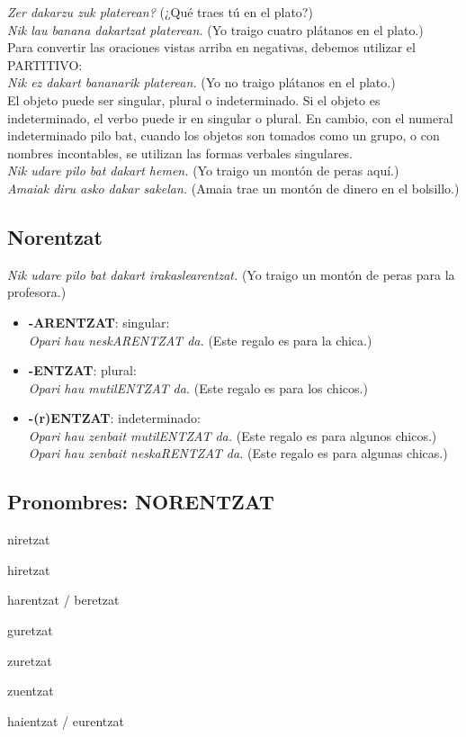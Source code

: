 \documentclass[11pt, a4paper]{article}
\begin{document}
\indent \textit{Zer dakarzu zuk platerean?} (¿Qué traes tú en el plato?)\\
\indent \textit{Nik lau banana dakartzat platerean.} (Yo traigo cuatro plátanos en el plato.)\\

\noindent Para convertir las oraciones vistas arriba en negativas, debemos utilizar el PARTITIVO:\\
\indent \textit{Nik ez dakart bananarik platerean.} (Yo no traigo plátanos en el plato.)\\

\noindent El objeto puede ser singular, plural o indeterminado. Si el objeto es indeterminado, el verbo puede ir en singular o plural. En cambio, con el numeral indeterminado pilo bat, cuando los objetos son tomados como un grupo, o con nombres incontables, se utilizan las formas verbales singulares.\\
\indent \textit{Nik udare pilo bat dakart hemen.} (Yo traigo un montón de peras aquí.)\\
\indent \textit{Amaiak diru asko dakar sakelan.} (Amaia trae un montón de dinero en el bolsillo.)

\subsection{Norentzat}
\indent \indent \textit{Nik udare pilo bat dakart irakaslearentzat.} (Yo traigo un montón de peras para la profesora.)\\
\begin{itemize}
\item \textbf{-ARENTZAT}: singular:\\
\textit{Opari hau neskARENTZAT da.}
(Este regalo es para la chica.)
\item \textbf{-ENTZAT}: plural:\\
\textit{Opari hau mutilENTZAT da.}
(Este regalo es para los chicos.)
\item \textbf{-(r)ENTZAT}: indeterminado:\\
\textit{Opari hau zenbait mutilENTZAT da.}
(Este regalo es para algunos chicos.)\\
\textit{Opari hau zenbait neskaRENTZAT da.}
(Este regalo es para algunas chicas.)
\end{itemize}

\subsection{Pronombres: NORENTZAT}
\begin{itemize}
\begin{multicols}{2}
\item niretzat
\item hiretzat
\item harentzat / beretzat\\
\item guretzat
\item zuretzat
\item zuentzat
\item haientzat / eurentzat
\end{multicols}
\end{itemize}
\end{document}
